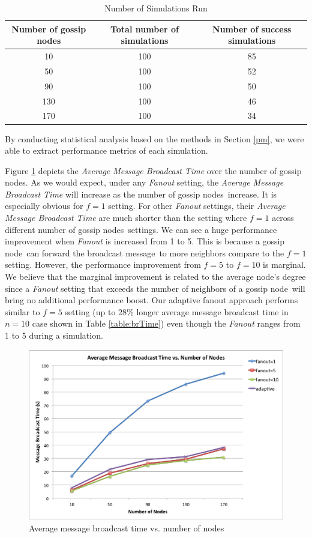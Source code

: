 \documentclass[onehalf,11pt]{beavtex}
\newcommand{\msg}{message}
\newcommand{\gn}{gossip node}
\newcommand{\gns}{gossip nodes}
\newcommand{\ambt}{Average Message Broadcast Time}
\begin{document}
\begin{table}[h]
	\centering
	\caption{Number of Simulations Run}
	\label{table:sim}
	\begin{tabular}{|c|c|c|}
		\hline 
		Number of gossip nodes & Total number of simulations & Number of success simulations \\ 
		\hline 
		10 & 100 & 85 \\ 
		\hline 
		50 & 100 & 52 \\ 
		\hline 
		90 & 100 & 50 \\ 
		\hline 
		130 & 100 & 46 \\ 
		\hline 
		170 & 100 & 34 \\ 
		\hline 
	\end{tabular} 
\end{table}

By conducting statistical analysis based on the methods in Section \ref{pm}, we were able to extract performance metrics of each simulation. 

Figure \ref{fig:brTime} depicts the \emph{Average Message Broadcast Time} over the number of \gns. As we would expect, under any \emph{Fanout} setting, the \emph{\ambt} will increase as the number of \gns ~increase. It is especially obvious for $f=1$ setting. For other \emph{Fanout} settings, their \emph{\ambt} are much shorter than the setting where $f=1$ across different number of \gns ~settings. We can see a huge performance improvement when \emph{Fanout} is increased from 1 to 5. This is because a \gn ~can forward the broadcast \msg ~to more neighbors compare to the $f=1$ setting. However, the performance improvement from $f=5$ to $f=10$ is marginal. We believe that the marginal improvement is related to the average node's degree since a \emph{Fanout} setting that exceeds the number of neighbors of a \gn ~will bring no additional performance boost. Our adaptive fanout approach performs similar to $f=5$ setting (up to $28\%$ longer average message broadcast time in $n=10$ case shown in Table \ref{table:brTime}) even though the \emph{Fanout} ranges from 1 to 5 during a simulation. 

\begin{figure} 
	\centering
	\includegraphics[width=5.5in]{brTime.png}
	\caption{Average message broadcast time vs. number of nodes}
	\label{fig:brTime}
\end{figure}
\end{document}
